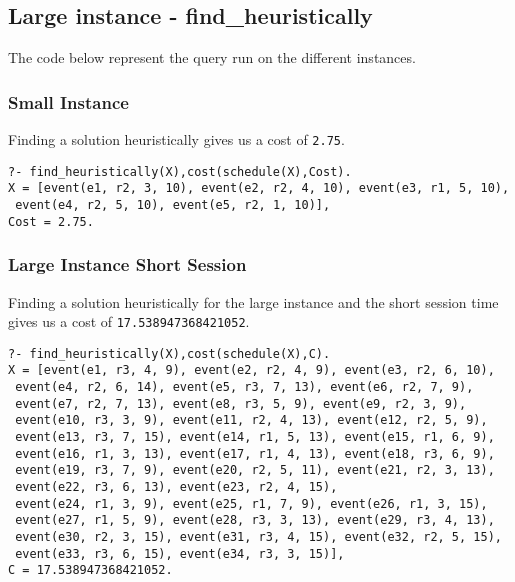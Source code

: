 \documentclass[a4paper]{article}
\begin{document}
\subsection{Large instance - find\_heuristically}
The code below represent the query run on the different instances.
\subsubsection{Small Instance}
Finding a solution heuristically gives us a cost of \texttt{2.75}.
\begin{lstlisting}[style=Linux]
?- find_heuristically(X),cost(schedule(X),Cost).
X = [event(e1, r2, 3, 10), event(e2, r2, 4, 10), event(e3, r1, 5, 10),
 event(e4, r2, 5, 10), event(e5, r2, 1, 10)],
Cost = 2.75.
\end{lstlisting}

\subsubsection{Large Instance Short Session}
Finding a solution heuristically for the large instance and the short session time gives us a cost of \texttt{17.538947368421052}.
\begin{lstlisting}[style=Linux]
?- find_heuristically(X),cost(schedule(X),C).
X = [event(e1, r3, 4, 9), event(e2, r2, 4, 9), event(e3, r2, 6, 10),
 event(e4, r2, 6, 14), event(e5, r3, 7, 13), event(e6, r2, 7, 9),
 event(e7, r2, 7, 13), event(e8, r3, 5, 9), event(e9, r2, 3, 9),
 event(e10, r3, 3, 9), event(e11, r2, 4, 13), event(e12, r2, 5, 9),
 event(e13, r3, 7, 15), event(e14, r1, 5, 13), event(e15, r1, 6, 9),
 event(e16, r1, 3, 13), event(e17, r1, 4, 13), event(e18, r3, 6, 9),
 event(e19, r3, 7, 9), event(e20, r2, 5, 11), event(e21, r2, 3, 13),
 event(e22, r3, 6, 13), event(e23, r2, 4, 15),
 event(e24, r1, 3, 9), event(e25, r1, 7, 9), event(e26, r1, 3, 15),
 event(e27, r1, 5, 9), event(e28, r3, 3, 13), event(e29, r3, 4, 13),
 event(e30, r2, 3, 15), event(e31, r3, 4, 15), event(e32, r2, 5, 15),
 event(e33, r3, 6, 15), event(e34, r3, 3, 15)],
C = 17.538947368421052.
\end{lstlisting}
\end{document}

